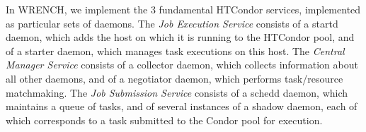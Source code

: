 In W\+R\+E\+N\+CH, we implement the 3 fundamental H\+T\+Condor services, implemented as particular sets of daemons. The {\itshape Job Execution Service} consists of a {\ttfamily startd} daemon, which adds the host on which it is running to the H\+T\+Condor pool, and of a {\ttfamily starter} daemon, which manages task executions on this host. The {\itshape Central Manager Service} consists of a {\ttfamily collector} daemon, which collects information about all other daemons, and of a {\ttfamily negotiator} daemon, which performs task/resource matchmaking. The {\itshape Job Submission Service} consists of a {\ttfamily schedd} daemon, which maintains a queue of tasks, and of several instances of a {\ttfamily shadow} daemon, each of which corresponds to a task submitted to the Condor pool for execution.

 